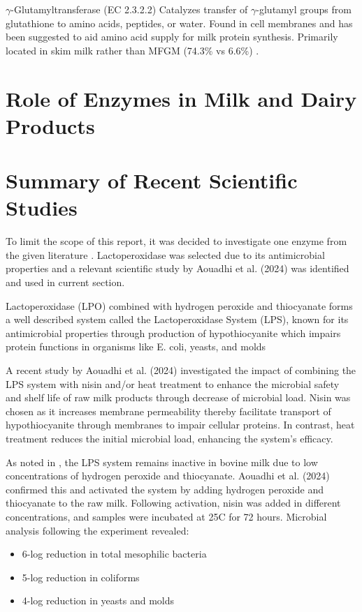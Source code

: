 $\gamma$-Glutamyltransferase (EC 2.3.2.2) Catalyzes transfer of $\gamma$-glutamyl groups from glutathione to amino acids, peptides, or water. Found in cell membranes and  has been suggested to aid amino acid supply for milk protein synthesis. Primarily located in skim milk rather than MFGM (74.3\% vs 6.6\%) \cite*{RM_01}.

\section{Role of Enzymes in Milk and Dairy Products}


\section{Summary of Recent Scientific Studies}
To limit the scope of this report, it was decided to investigate one enzyme from the given literature \cite*{RM_01}. Lactoperoxidase was selected due to its antimicrobial properties and a relevant scientific study by Aouadhi et al. (2024) was identified and used in current section. 

\vline

Lactoperoxidase (LPO) combined with hydrogen peroxide and thiocyanate forms a well described system called the Lactoperoxidase System (LPS), known for its antimicrobial properties through production of hypothiocyanite which impairs protein functions in organisms like E. coli, yeasts, and molds \cite*{RM_02}

\vline

A recent study by Aouadhi et al. (2024) investigated the impact of combining the LPS system with nisin and/or heat treatment to enhance the microbial safety and shelf life of raw milk products through decrease of microbial load. 
Nisin was chosen as it increases membrane permeability thereby facilitate transport of hypothiocyanite through membranes to impair cellular proteins. In contrast, heat treatment reduces the initial microbial load, enhancing the system's efficacy.

\vline

As noted in \cite*{RM_01}, the LPS system remains inactive in bovine milk due to low concentrations of hydrogen peroxide and thiocyanate. Aouadhi et al. (2024) confirmed this and activated the system by adding hydrogen peroxide and thiocyanate to the raw milk. Following activation, nisin was added in different concentrations, and samples were incubated at 25\textdegree C for 72 hours. Microbial analysis following the experiment revealed:
\begin{itemize}
    \item 6-log reduction in total mesophilic bacteria
    \item 5-log reduction in coliforms
    \item 4-log reduction in yeasts and molds
\end{itemize}


